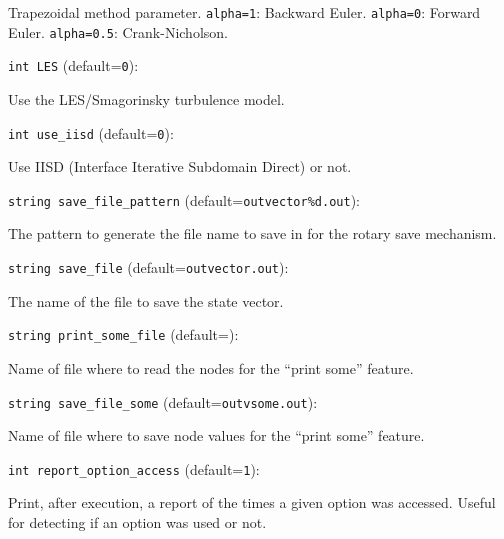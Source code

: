 Trapezoidal method parameter. \verb+alpha=1+:
Backward Euler. \verb+alpha=0+: Forward Euler.
\verb+alpha=0.5+: Crank-Nicholson. 

\item\verb+int LES+ {\rm(default=\verb|0|)}:

Use the LES/Smagorinsky turbulence model. 

\item\verb+int use_iisd+ {\rm(default=\verb|0|)}:

Use IISD (Interface Iterative Subdomain Direct) or not.

\item\verb+string save_file_pattern+ {\rm(default=\verb|outvector%d.out|)}:

The pattern to generate the file name to save in for
the rotary save mechanism.

\item\verb+string save_file+ {\rm(default=\verb|outvector.out|)}:

The name of the file to save the state vector. 

\item\verb+string print_some_file+ {\rm(default=\verb||)}:

Name of file where to read the nodes for the ``print some'' 
feature. 

\item\verb+string save_file_some+ {\rm(default=\verb|outvsome.out|)}:

Name of file where to save node values for the ``print some'' 
feature. 

\item\verb+int report_option_access+ {\rm(default=\verb|1|)}:

Print, after execution, a report of the times a given option
was accessed. Useful for detecting if an option was used or not.

